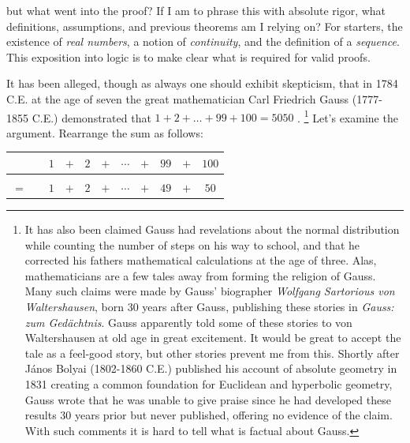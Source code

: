     but what went into the proof? If I am to phrase this with absolute rigor,
    what definitions, assumptions, and previous theorems am I relying on? For
    starters, the existence of \textit{real numbers}, a notion of
    \textit{continuity}, and the definition of a \textit{sequence}. This
    exposition into logic is to make clear what is required for valid proofs.
    \begin{example}
        \label{ex:logic_gauss_sum_one_to_one_hundred}%
        It has been alleged, though as always one should exhibit skepticism,
        that in 1784 C.E. at the age of seven the great mathematician Carl
        Friedrich Gauss (1777-1855 C.E.)
        demonstrated that $1+2+\dots+99+100=5050$
        \cite[p.~12-13]{von1856gauss}.%
        \footnote{%
            It has also been claimed Gauss had revelations about the normal
            distribution while counting the number of steps on his way to
            school, and that he corrected his fathers mathematical calculations
            at the age of three. Alas, mathematicians are a few tales away from
            forming the religion of Gauss. Many such claims were made by
            Gauss' biographer \textit{Wolfgang Sartorious von Waltershausen},
            born 30 years after Gauss, publishing these stories in
            \textit{Gauss: zum Ged\"{a}chtnis}. Gauss apparently told some of
            these stories to von Waltershausen at old age in great excitement.
            It would be great to accept the tale as a feel-good story, but
            other stories prevent me from this. Shortly after J\'{a}nos Bolyai
            (1802-1860 C.E.) published his account of
            absolute geometry in 1831 creating a common foundation for Euclidean
            and hyperbolic geometry, Gauss wrote that he was unable to give
            praise since he had developed these results 30 years prior but
            never published, offering no evidence of the claim. With such
            comments it is hard to tell what is factual about Gauss.
        }
        Let's examine the argument. Rearrange the sum as follows:
        \begin{table}[H]
            \centering
            \captionsetup{type=table}
            \begin{tabular}{ccccccccccc}
                &&$1$&$+$&$2$&$+$&$\cdots$&$+$&$99$&$+$&$100$\\
                \hline\\
                $=$&&$1$&$+$&$2$&$+$&$\cdots$&$+$&$49$&$+$&$50$\\

\end{tabular}
\end{table}
\end{example}

